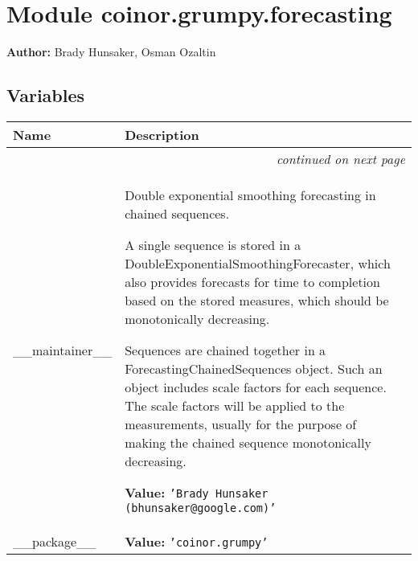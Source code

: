 %
%
%


\section{Module coinor.grumpy.forecasting}

    \label{coinor:grumpy:forecasting}
\textbf{Author:} Brady Hunsaker, Osman Ozaltin





  \subsection{Variables}

    \vspace{-1cm}
\hspace{\varindent}\begin{longtable}{|p{\varnamewidth}|p{\vardescrwidth}|l}
\cline{1-2}
\cline{1-2} \centering \textbf{Name} & \centering \textbf{Description}& \\
\cline{1-2}
\endhead\cline{1-2}\multicolumn{3}{r}{\small\textit{continued on next page}}\\\endfoot\cline{1-2}
\endlastfoot\raggedright \_\-\_\-m\-a\-i\-n\-t\-a\-i\-n\-e\-r\-\_\-\_\- & \raggedright Double exponential smoothing forecasting in chained sequences.

          A single sequence is stored in a 
          DoubleExponentialSmoothingForecaster, which also provides 
          forecasts for time to completion based on the stored measures, 
          which should be monotonically decreasing.

          Sequences are chained together in a ForecastingChainedSequences 
          object. Such an object includes scale factors for each sequence.
          The scale factors will be applied to the measurements, usually 
          for the purpose of making the chained sequence monotonically 
          decreasing.

\textbf{Value:} 
{\tt \texttt{'}\texttt{Brady Hunsaker (bhunsaker@google.com)}\texttt{'}}&\\
\cline{1-2}
\raggedright \_\-\_\-p\-a\-c\-k\-a\-g\-e\-\_\-\_\- & \raggedright \textbf{Value:} 
{\tt \texttt{'}\texttt{coinor.grumpy}\texttt{'}}&\\
\cline{1-2}
\end{longtable}



